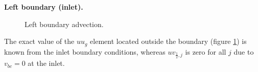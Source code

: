 \documentclass{article}
\begin{document}
\textbf{Left boundary (inlet).} 
\begin{figure}[H] %
  \caption{Left boundary advection.}\label{fig:ADV-left}
\end{figure}
The exact value of the $uu_g$ element located outside the boundary (figure \ref{fig:ADV-left}) is known from the inlet boundary conditions, whereas $uv_{\frac{1}{2},j}$ is zero for all $j$ due to $v_{bc}=0$ at the inlet. 
\end{document}
